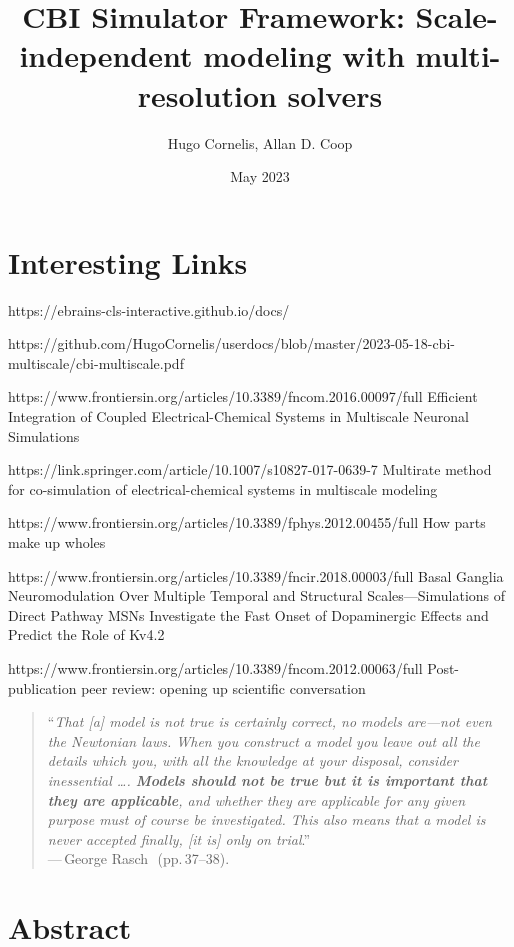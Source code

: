 \documentclass{article}
\title{CBI Simulator Framework: Scale-independent modeling with multi-resolution solvers}
\author{Hugo Cornelis, Allan D. Coop}
\date{May 2023}
\begin{document}
\maketitle

\section*{Interesting Links}

https://ebrains-cls-interactive.github.io/docs/

https://github.com/HugoCornelis/userdocs/blob/master/2023-05-18-cbi-multiscale/cbi-multiscale.pdf


https://www.frontiersin.org/articles/10.3389/fncom.2016.00097/full
Efficient Integration of Coupled Electrical-Chemical Systems in Multiscale Neuronal Simulations

https://link.springer.com/article/10.1007/s10827-017-0639-7
Multirate method for co-simulation of electrical-chemical systems in multiscale modeling

https://www.frontiersin.org/articles/10.3389/fphys.2012.00455/full
How parts make up wholes

https://www.frontiersin.org/articles/10.3389/fncir.2018.00003/full
Basal Ganglia Neuromodulation Over Multiple Temporal and Structural Scales—Simulations of Direct Pathway MSNs Investigate the Fast Onset of Dopaminergic Effects and Predict the Role of Kv4.2

https://www.frontiersin.org/articles/10.3389/fncom.2012.00063/full
Post-publication peer review: opening up scientific conversation
\begin{quote}
    ``\small{\textit{That \textnormal{[a]} model is not true is certainly correct, no models are—not even the Newtonian laws. When you construct a model you leave out all the details which you, with all the knowledge at your disposal, consider inessential \ldots. \textbf{Models should not be true but it is important that they are applicable}, and whether they are applicable for any given purpose must of course be investigated. This also means that a model is never accepted finally, \textnormal{[it is]} only on trial}.''\\
    ---\,George Rasch~\cite{rasch80}}\,(pp.\,37--38).
\end{quote}


\section*{Abstract}
\end{document}
